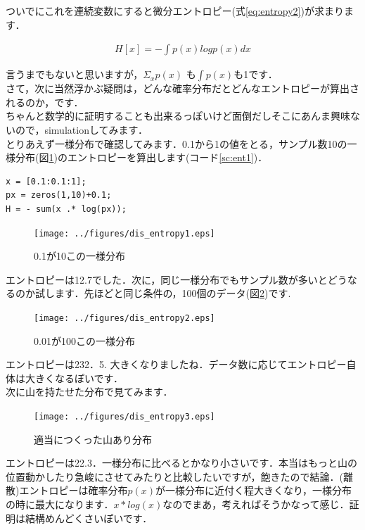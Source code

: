 \documentclass[11pt,a4paper,uplatex]{ujreport}
\begin{document}
ついでにこれを連続変数にすると微分エントロピー(式\ref{eq:entropy2})が求まります．

\begin{eqnarray}
\label{eq:entropy2}
H[x] = - \int p(x) log p(x) dx
\end{eqnarray}

言うまでもないと思いますが，$ \Sigma_{x} p(x)$ も$ \int p(x)$も1です．\\

さて，次に当然浮かぶ疑問は，どんな確率分布だとどんなエントロピーが算出されるのか，です．\\

ちゃんと数学的に証明することも出来るっぽいけど面倒だしそこにあんま興味ないので，simulationしてみます．\\

とりあえず一様分布で確認してみます．0.1から1の値をとる，サンプル数10の一様分布(図\ref{im:ent1})のエントロピーを算出します(コード\ref{sc:ent1})．
\begin{lstlisting}[caption=エントロピーの計算,label=sc:ent1]
x = [0.1:0.1:1];
px = zeros(1,10)+0.1;
H = - sum(x .* log(px));

\end{lstlisting}

\begin{figure}[H]
\label{im:ent1}
  \centering
  \texttt{[image: ../figures/dis\_entropy1.eps]}
  \caption{0.1が10この一様分布}
\end{figure}

エントロピーは12.7でした．次に，同じ一様分布でもサンプル数が多いとどうなるのか試します．先ほどと同じ条件の，100個のデータ(図\ref{im:ent2})です.

\begin{figure}[H]
\label{im:ent2}
  \centering
  \texttt{[image: ../figures/dis\_entropy2.eps]}
  \caption{0.01が100この一様分布}
\end{figure}

エントロピーは232．5. 大きくなりましたね．データ数に応じてエントロピー自体は大きくなるぽいです．\\

次に山を持たせた分布で見てみます．

\begin{figure}[H]
\label{im:ent3}
  \centering
  \texttt{[image: ../figures/dis\_entropy3.eps]}
  \caption{適当につくった山あり分布}
\end{figure}

エントロピーは22.3．一様分布に比べるとかなり小さいです．本当はもっと山の位置動かしたり急峻にさせてみたりと比較したいですが，飽きたので結論．(離散)エントロピーは確率分布$p(x)$が一様分布に近付く程大きくなり，一様分布の時に最大になります．$x * log(x)$なのでまあ，考えればそうかなって感じ．証明は結構めんどくさいぽいです．\\
\end{document}
